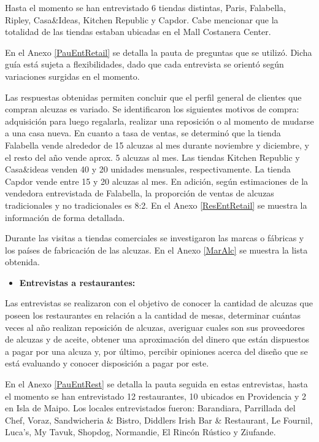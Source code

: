 Hasta el momento se han entrevistado 6 tiendas distintas, Paris, Falabella, Ripley, Casa\&Ideas, Kitchen Republic y Capdor. Cabe mencionar que la totalidad de las tiendas estaban ubicadas en el Mall Costanera Center.

En el Anexo \ref{PauEntRetail} se detalla la pauta de preguntas que se utilizó. Dicha guía está sujeta a flexibilidades, dado que cada entrevista se orientó según variaciones surgidas en el momento.

Las respuestas obtenidas permiten concluir que el perfil general de clientes que compran alcuzas es variado. Se identificaron los siguientes motivos de compra: adquisición para luego regalarla, realizar una reposición o al momento de mudarse a una casa nueva. En cuanto a tasa de ventas, se determinó que la tienda Falabella vende alrededor de 15 alcuzas al mes durante noviembre y diciembre, y el resto del año vende aprox. 5 alcuzas al mes. Las tiendas Kitchen Republic y Casa\&ideas venden 40 y 20 unidades mensuales, respectivamente.  La tienda Capdor vende entre 15 y 20 alcuzas al mes. En adición, según estimaciones de la vendedora entrevistada de Falabella, la proporción de ventas de alcuzas tradicionales y no tradicionales es 8:2. En el Anexo \ref{ResEntRetail} se muestra la información de forma detallada.

Durante las visitas a tiendas comerciales se investigaron las marcas o fábricas y los países de fabricación de las alcuzas. En el Anexo \ref{MarAlc} se muestra la lista obtenida.



\begin{itemize}
\item \textbf{Entrevistas a restaurantes:}
\end{itemize}

Las entrevistas se realizaron con el objetivo de conocer la cantidad de alcuzas que poseen los restaurantes en relación a la cantidad de mesas, determinar cuántas veces al año realizan reposición de alcuzas, averiguar cuales son sus proveedores de alcuzas y de aceite, obtener una aproximación del dinero que están dispuestos a pagar por una alcuza y, por último, percibir opiniones acerca del diseño que se está evaluando y conocer disposición a pagar por este.

En el Anexo \ref{PauEntRest} se detalla la pauta seguida en estas entrevistas, hasta el momento se han entrevistado 12 restaurantes, 10 ubicados en Providencia y 2 en Isla de Maipo. Los locales entrevistados fueron: Barandiara, Parrillada del Chef, Voraz, Sandwicheria \& Bistro, Diddlers Irish Bar \& Restaurant, Le Fournil, Luca’s, My Tavuk, Shopdog, Normandie, El Rincón Rústico y Ziufande.



